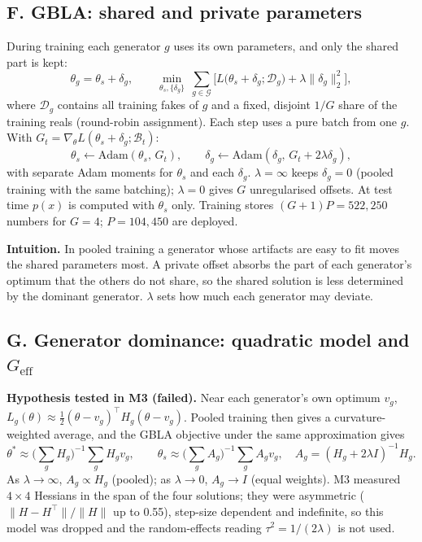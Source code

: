 \documentclass[10pt,a4paper]{article}
\begin{document}
\subsection{F. GBLA: shared and private parameters}\label{sec:gbla-math}
During training each generator \(g\) uses its own parameters, and only the shared part is kept:
\begin{equation}\label{eq:gbla}
\theta_g=\theta_s+\delta_g,\qquad
\min_{\theta_s,\{\delta_g\}}\ \sum_{g\in\mathcal{G}}\Big[L\big(\theta_s+\delta_g;\mathcal{D}_g\big)+\lambda\|\delta_g\|_2^2\Big],
\end{equation}
where \(\mathcal{D}_g\) contains all training fakes of \(g\) and a fixed, disjoint \(1/G\) share of the
training reals (round-robin assignment). Each step uses a pure batch from one \(g\). With
\(G_t=\nabla_\theta L(\theta_s+\delta_g;\mathcal{B}_t)\):
\begin{equation}
\theta_s\leftarrow\mathrm{Adam}(\theta_s,\,G_t),\qquad
\delta_g\leftarrow\mathrm{Adam}(\delta_g,\,G_t+2\lambda\delta_g),
\end{equation}
with separate Adam moments for \(\theta_s\) and each \(\delta_g\). \(\lambda=\infty\) keeps
\(\delta_g=0\) (pooled training with the same batching); \(\lambda=0\) gives \(G\) unregularised
offsets. At test time \(p(x)\) is computed with \(\theta_s\) only. Training stores
\((G+1)P=522{,}250\) numbers for \(G=4\); \(P=104{,}450\) are deployed.

\textbf{Intuition.} In pooled training a generator whose artifacts are easy to fit moves the shared
parameters most. A private offset absorbs the part of each generator's optimum that the others do
not share, so the shared solution is less determined by the dominant generator. \(\lambda\) sets how
much each generator may deviate.

\subsection{G. Generator dominance: quadratic model and \(G_\text{eff}\)}\label{sec:geff-math}
\textbf{Hypothesis tested in M3 (failed).} Near each generator's own optimum \(v_g\),
\(L_g(\theta)\approx\tfrac12(\theta-v_g)^\top H_g(\theta-v_g)\). Pooled training then gives a
curvature-weighted average, and the GBLA objective under the same approximation gives
\begin{equation}
\theta^*\approx\Big(\sum_g H_g\Big)^{-1}\sum_g H_g v_g,\qquad
\theta_s\approx\Big(\sum_g A_g\Big)^{-1}\sum_g A_g v_g,\quad A_g=(H_g+2\lambda I)^{-1}H_g .
\end{equation}
As \(\lambda\to\infty\), \(A_g\propto H_g\) (pooled); as \(\lambda\to0\), \(A_g\to I\) (equal weights).
M3 measured \(4\times4\) Hessians in the span of the four solutions; they were asymmetric
(\(\|H-H^\top\|/\|H\|\) up to 0.55), step-size dependent and indefinite, so this model was dropped and
the random-effects reading \(\tau^2=1/(2\lambda)\) is not used.
\end{document}
